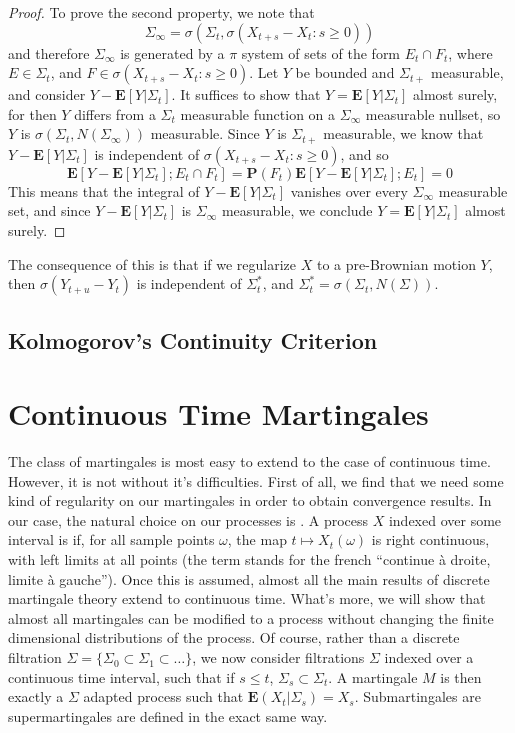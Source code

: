 \begin{proof}
    To prove the second property, we note that
    \[ \Sigma_\infty = \sigma(\Sigma_t, \sigma(X_{t+s} - X_t: s \geq 0)) \]
    and therefore $\Sigma_\infty$ is generated by a $\pi$ system of sets of the form $E_t \cap F_t$, where $E \in \Sigma_t$, and $F \in \sigma(X_{t+s} - X_t: s \geq 0)$. Let $Y$ be bounded and $\Sigma_{t+}$ measurable, and consider $Y - \mathbf{E}[Y|\Sigma_t]$. It suffices to show that $Y = \mathbf{E}[Y|\Sigma_t]$ almost surely, for then $Y$ differs from a $\Sigma_t$ measurable function on a $\Sigma_\infty$ measurable nullset, so $Y$ is $\sigma(\Sigma_t, N(\Sigma_\infty))$ measurable. Since $Y$ is $\Sigma_{t+}$ measurable, we know that $Y - \mathbf{E}[Y|\Sigma_t]$ is independent of $\sigma(X_{t+s} - X_t: s \geq 0)$, and so
    \[ \mathbf{E}[Y - \mathbf{E}[Y|\Sigma_t];E_t \cap F_t] = \mathbf{P}(F_t) \mathbf{E}[Y - \mathbf{E}[Y|\Sigma_t];E_t] = 0 \]
    This means that the integral of $Y - \mathbf{E}[Y|\Sigma_t]$ vanishes over every $\Sigma_\infty$ measurable set, and since $Y - \mathbf{E}[Y|\Sigma_t]$ is $\Sigma_\infty$ measurable, we conclude $Y = \mathbf{E}[Y|\Sigma_t]$ almost surely.
\end{proof}

The consequence of this is that if we regularize $X$ to a \cadlag pre-Brownian motion $Y$, then $\sigma(Y_{t+u} - Y_t)$ is independent of $\Sigma^*_t$, and $\Sigma^*_t = \sigma(\Sigma_t, N(\Sigma))$.

\section{Kolmogorov's Continuity Criterion}

\chapter{Continuous Time Martingales}

The class of martingales is most easy to extend to the case of continuous time. However, it is not without it's difficulties. First of all, we find that we need some kind of regularity on our martingales in order to obtain convergence results. In our case, the natural choice on our processes is {\it \cadlag}. A process $X$ indexed over some interval is \cadlag if, for all sample points $\omega$, the map $t \mapsto X_t(\omega)$ is right continuous, with left limits at all points (the term \cadlag stands for the french ``continue \`{a} droite, limite \`{a} gauche''). Once this is assumed, almost all the main results of discrete martingale theory extend to continuous time. What's more, we will show that almost all martingales can be modified to a \cadlag process without changing the finite dimensional distributions of the process. Of course, rather than a discrete filtration $\Sigma = \{ \Sigma_0 \subset \Sigma_1 \subset \dots \}$, we now consider filtrations $\Sigma$ indexed over a continuous time interval, such that if $s \leq t$, $\Sigma_s \subset \Sigma_t$. A martingale $M$ is then exactly a $\Sigma$ adapted process such that $\mathbf{E}(X_t|\Sigma_s) = X_s$. Submartingales are supermartingales are defined in the exact same way.

